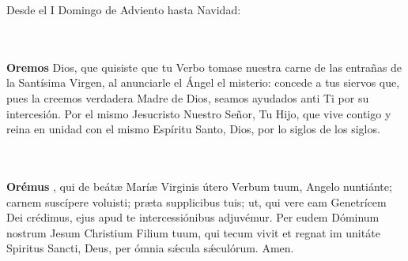 \documentclass[10pt,a4paper,oneside]{book}
\begin{document}
\noindent\small{Desde el I Domingo de Adviento hasta Navidad:}\\
\begin{minipage}[t]{0.475\textwidth}
    \\\\
    \textbf{Oremos}
     Dios, que quisiste que tu Verbo tomase nuestra carne de las entrañas de la Santísima Virgen, al anunciarle el Ángel el misterio: concede a tus siervos que, pues
    la creemos verdadera Madre de Dios, seamos ayudados anti Ti por su intercesión. Por el mismo Jesucristo Nuestro Señor, Tu Hijo, que vive contigo y reina en unidad con el mismo Espíritu
    Santo, Dios, por lo siglos de los siglos.
\end{minipage}
\begin{minipage}[t]{0.475\textwidth}
    \\\\
    \textbf{Orémus}
    , qui de beát{\ae} Marí{\ae} Virginis útero Verbum tuum, Angelo nuntiánte; carnem suscípere voluisti; pr{\ae}ta supplicibus tuis; ut, qui vere eam Genetrícem
    Dei crédimus, ejus apud te intercessiónibus adjuvémur. Per eudem Dóminum nostrum Jesum Christium Filium tuum, qui tecum vivit et regnat im unitáte Spiritus Sancti, Deus, per ómnia
    s{\'\ae}cula s{\'\ae}culórum. Amen.
\end{minipage}

\bigskip
\end{document}
